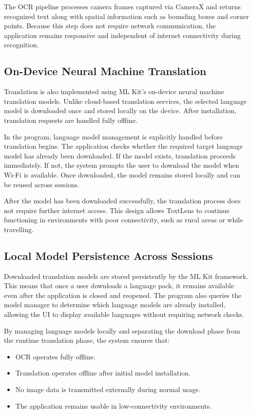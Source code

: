 The OCR pipeline processes camera frames captured via CameraX and returns recognized text along with spatial information such as bounding boxes and corner points. Because this step does not require network communication, the application remains responsive and independent of internet connectivity during recognition.

\subsection{On-Device Neural Machine Translation}

Translation is also implemented using ML Kit's on-device neural machine translation models. Unlike cloud-based translation services, the selected language model is downloaded once and stored locally on the device. After installation, translation requests are handled fully offline.

In the program, language model management is explicitly handled before translation begins. The application checks whether the required target language model has already been downloaded. If the model exists, translation proceeds immediately. If not, the system prompts the user to download the model when Wi-Fi is available. Once downloaded, the model remains stored locally and can be reused across sessions.

After the model has been downloaded successfully, the translation process does not require further internet access. This design allows TextLens to continue functioning in environments with poor connectivity, such as rural areas or while travelling.

\subsection{Local Model Persistence Across Sessions}

Downloaded translation models are stored persistently by the ML Kit framework. This means that once a user downloads a language pack, it remains available even after the application is closed and reopened. The program also queries the model manager to determine which language models are already installed, allowing the UI to display available languages without requiring network checks.

By managing language models locally and separating the download phase from the runtime translation phase, the system ensures that:

\begin{itemize}
    \item OCR operates fully offline.
    \item Translation operates offline after initial model installation.
    \item No image data is transmitted externally during normal usage.
    \item The application remains usable in low-connectivity environments.
\end{itemize}

